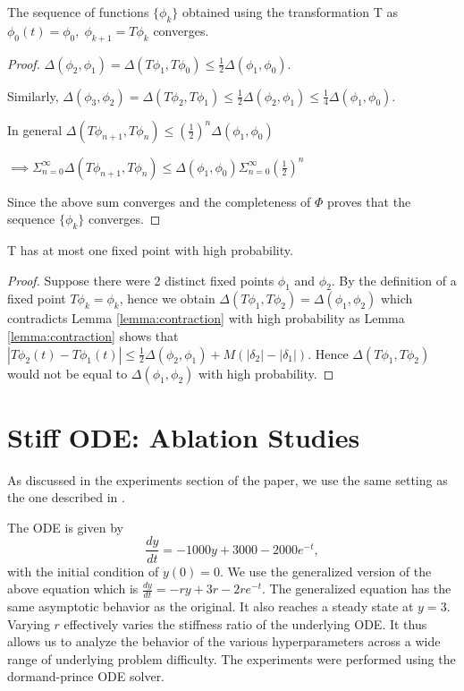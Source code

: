 \begin{lemma}
	The sequence of functions $\{ \phi_k \}$ obtained using the transformation T as $\phi_0(t)=\phi_0, \; \phi_{k+1}=T \phi_k$ converges.
	\label{lemma:sequence_convergence}
\end{lemma}
\begin{proof}
	$\Delta(\phi_2,\phi_1)=\Delta(T\phi_1,T\phi_0) \leq \frac{1}{2} \Delta(\phi_1,\phi_0) .$
	
	Similarly, $\Delta(\phi_3,\phi_2)=\Delta(T\phi_2,T\phi_1) \leq \frac{1}{2} \Delta(\phi_2,\phi_1) \leq \frac{1}{4} \Delta(\phi_1,\phi_0) .$
	
	In general $\Delta(T\phi_{n+1},T\phi_n) \leq \left( \frac{1}{2} \right)^n \Delta(\phi_1,\phi_0) $
	
	$\implies \Sigma_{n=0}^{\infty} \Delta(T\phi_{n+1},T\phi_n) \leq \Delta(\phi_1,\phi_0) \Sigma_{n=0}^{\infty} \left( \frac{1}{2} \right)^n  $
	
	Since the above sum converges and the completeness of $\Phi$ proves that the sequence $ \{ \phi_k \} $ converges.
\end{proof}

\begin{lemma}
	T has at most one fixed point with high probability.
	\label{lemma:unique}
\end{lemma}

\begin{proof}
	Suppose there were 2 distinct fixed points $\phi_1$ and $\phi_2$. By the definition of a fixed point $T\phi_k=\phi_k$, hence we obtain $\Delta(T\phi_1,T\phi_2)=\Delta(\phi_1,\phi_2)$ which contradicts Lemma \ref{lemma:contraction}  with high probability as Lemma \ref{lemma:contraction} shows that $|T\phi_{2}(t) - T\phi_{1}(t)| \leq \frac{1}{2} \Delta(\phi_2,\phi_1) + M(| \delta_{2}| -  | \delta_1|) $. Hence $\Delta(T\phi_1,T\phi_2)$ would not be equal to $\Delta(\phi_1,\phi_2)$ with high probability.
\end{proof}



\section{Stiff ODE: Ablation Studies}
As discussed in the experiments section of the paper, we use the same setting as the one described in \cite{chapra2010numerical}. 

The ODE is given by 
\begin{equation}
	\frac{dy}{dt}= -1000y + 3000 - 2000e^{-t},
	\label{eq:app_stiff}
\end{equation}
with the initial condition of $y(0)=0$. We use the generalized version of the above equation which is $\frac{dy}{dt}= -ry + 3r - 2re^{-t}$. The generalized equation has the same asymptotic behavior as the original. It also reaches a steady state at $y=3$. Varying $r$ effectively varies the stiffness ratio of the underlying ODE. It thus allows us to analyze the behavior of the various hyperparameters across a wide range of underlying problem difficulty. The experiments were performed using the dormand-prince \cite{dormand1980family} ODE solver.

